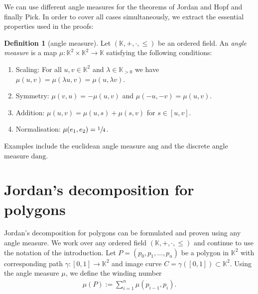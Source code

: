 \documentclass[a4paper]{amsart}
\numberwithin{equation}{section}
\theoremstyle{plain}
\theoremstyle{definition}
\newtheorem{definition}[theorem]{Definition}
\newcommand{\K}{\mathbb{K}}
\newcommand{\ang}{\mathrm{ang}}
\newcommand{\dang}{\mathrm{dang}}
\begin{document}
We can use different angle measures for the theorems of
Jordan and Hopf and finally Pick.
In order to cover all cases simultaneously, 
we extract the essential properties used in the proofs:

\begin{definition}[angle measure\label{def:AngleMeasure}]
  Let $(\K,+,\cdot,\le)$ be an ordered field.
  An \emph{angle measure} is a map $\mu \colon \K^2 \times \K^2 \to \K$
  satisfying the following conditions:
  \begin{enumerate}
  \item
    Scaling: For all $u,v \in \K^2$ and $\lambda \in \K_{>0}$
    we have $\mu(u,v) = \mu(\lambda u, v) = \mu(u, \lambda v)$.
  \item
    Symmetry: $\mu(v,u) = -\mu(u,v)$ and $\mu(-u,-v) = \mu(u,v)$.
  \item
    Addition: $\mu(u,v) = \mu(u,s) + \mu(s,v)$ for $s \in [u,v]$.
  \item
    Normalisation: $\mu(e_1,e_2) = \sfrac{1}{4}$.
  \end{enumerate}
\end{definition}

Examples include the euclidean angle measure $\ang$
and the discrete angle measure $\dang$.


\setcounter{section}{9}
\section{Jordan's decomposition for polygons}

Jordan's decomposition for polygons can be formulated
and proven using any angle measure. %
We work over any ordered field $(\K,+,\cdot,\le)$
and continue to use the notation of the introduction.
Let $P = (p_0,p_1,\ldots,p_n)$ be a polygon in $\K^2$
with corresponding path $\gamma \colon [0,1] \to \K^2$
and image curve $C = \gamma([0,1]) \subset \K^2$.
Using the angle measure $\mu$, we define the winding number 
\begin{align*}
  \mu(P) := \sum_{i=1}^n \mu(p_{i-1},p_i) .
\end{align*}
\end{document}
